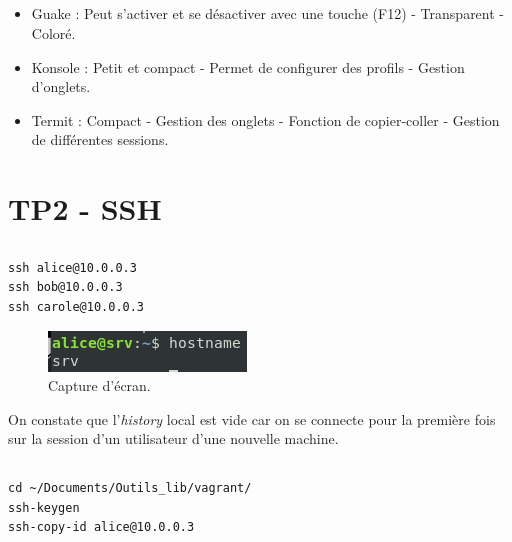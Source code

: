 \documentclass{article}
\begin{document}
\subsection{}

\begin{itemize}
    \item Guake :
Peut s’activer et se désactiver avec une touche (F12) -
Transparent -
Coloré.
\item Konsole :
Petit et compact -
Permet de configurer des profils -
Gestion d'onglets.
\item Termit :
Compact -
Gestion des onglets -
Fonction de copier-coller -
Gestion de différentes sessions.
\end{itemize}

\section{TP2 - SSH}

\subsection{}

\begin{lstlisting}
ssh alice@10.0.0.3
ssh bob@10.0.0.3
ssh carole@10.0.0.3
\end{lstlisting}

\begin{figure}[h]
\centering
\includegraphics[width=\textwidth]{images/q2-1.jpg}
\caption{\label{fig:frog}Capture d'écran.}
\end{figure}

\FloatBarrier

On constate que l'\emph{history} local est vide car on se connecte pour la première fois sur la session d'un utilisateur d'une nouvelle machine.

\subsection{}

\begin{lstlisting}
cd ~/Documents/Outils_lib/vagrant/
ssh-keygen
ssh-copy-id alice@10.0.0.3
\end{lstlisting}
\end{document}
